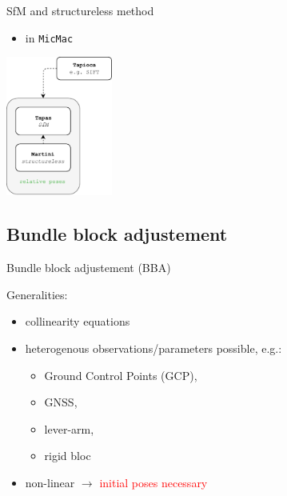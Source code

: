 \documentclass{beamer}
\begin{document}
		\begin{frame}{SfM and structureless method}
		
		\begin{itemize}
			\item in \texttt{MicMac}
		\end{itemize}
		
		\centering
		\includegraphics[width=3.5cm]{images/micmac_relative_pose.pdf}
		
		\end{frame}			
		
	\subsection{Bundle block adjustement}	
		\begin{frame}{Bundle block adjustement (BBA)}
		
		Generalities:
		\begin{itemize}
		\item collinearity equations
		\item heterogenous observations/parameters possible, e.g.:
			\begin{itemize}		
		 		\item Ground Control Points (GCP), 
		 		\item GNSS, 
		 		\item lever-arm,
		 		\item rigid bloc
		 	\end{itemize}		
		 	
		\item non-linear $\rightarrow$ \textcolor{red}{initial poses necessary}
		\end{itemize}		
		
		\end{frame}	
\end{document}
